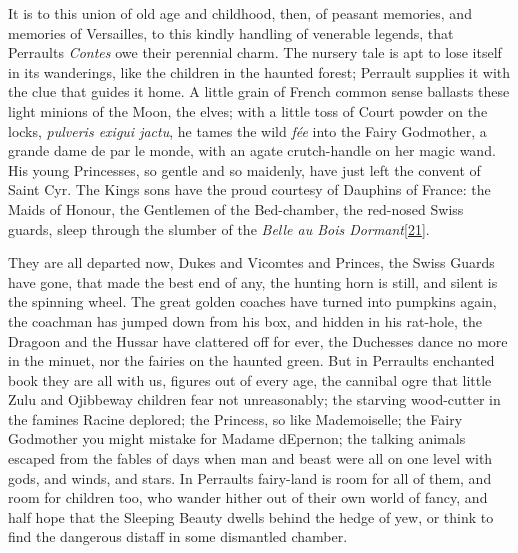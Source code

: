 \documentclass[14pt,a4paper]{memoir}
\begin{document}
It is to this union of old age and childhood, then, of peasant memories,
and memories of Versailles, to this kindly handling of venerable
legends, that Perrault\textquotesingle s \emph{Contes} owe their
perennial charm. The nursery tale is apt to lose itself in its
wanderings, like the children in the haunted forest; Perrault supplies
it with the clue that guides it home. A little grain of French common
sense ballasts these light minions of the Moon, the elves; with a little
toss of Court powder on the locks, \emph{pulveris exigui jactu}, he
tames the wild \emph{fée} into the Fairy Godmother, a grande dame de par
le monde, with an agate crutch-handle on her magic wand.
\textquotesingle His young Princesses, so gentle and so maidenly, have
just left the convent of Saint Cyr. The King\textquotesingle s sons have
the proud courtesy of Dauphins of France: the Maids of Honour, the
Gentlemen of the Bed-chamber, the red-nosed Swiss guards, sleep through
the slumber of the \emph{Belle au Bois
Dormant}\protect\hypertarget{4533318093929944247_33931-h-0.htm.xhtmlux5cux23FNanchor_21}{}{}\protect\hyperlink{4533318093929944247_33931-h-0.htm.xhtmlux5cux23Footnote_21}{{[}21{]}}.\textquotesingle{}

They are all departed now, Dukes and Vicomtes and Princes, the Swiss
Guards have gone, that made the best end of any, the hunting horn is
still, and silent is the spinning wheel. The great golden coaches have
turned into pumpkins again, the coachman has jumped down from his box,
and hidden in his rat-hole, the Dragoon and the Hussar have clattered
off for ever, the Duchesses dance no more in the minuet, nor the fairies
on the haunted green. But in Perrault\textquotesingle s enchanted book
they are all with us, figures out of every age, the cannibal ogre that
little Zulu and Ojibbeway children fear not unreasonably; the starving
wood-cutter in the famines Racine deplored; the Princess, so like
Mademoiselle; the Fairy Godmother you might mistake for Madame
d\textquotesingle Epernon; the talking animals escaped from the fables
of days when man and beast were all on one level with gods, and winds,
and stars. In Perrault\textquotesingle s fairy-land is room for all of
them, and room for children too, who wander hither out of their own
world of fancy, and half hope that the Sleeping Beauty dwells behind the
hedge of yew, or think to find the dangerous distaff in some dismantled
chamber.
\end{document}
